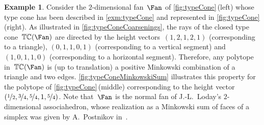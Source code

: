 \documentclass{amsart}
\theoremstyle{definition}
\newtheorem{example}[theorem]{Example}
\newcommand{\ctypeCone}{\smash{\overline{\mathbb{TC}}}} %
\begin{document}
\begin{example}
\label{exm:typeConeMinkowskiSum}
Consider the $2$-dimensional fan~$\Fan$ of \cref{fig:typeCone}\,(left) whose type cone has been described in \cref{exm:typeCone} and represented in \cref{fig:typeCone}\,(right).
As illustrated in \cref{fig:typeConeCoarsenings}, the rays of the closed type cone~$\ctypeCone(\Fan)$ are directed by the height vectors~$(1,2,1,2,1)$ (corresponding to a triangle), $(0,1,1,0,1)$ (corresponding to a vertical segment) and~$(1,0,1,1,0)$ (corresponding to a horizontal segment).
Therefore, any polytope in~$\ctypeCone(\Fan)$ is (up to translation) a positive Minkowski combination of a triangle and two edges.
\cref{fig:typeConeMinkowskiSum} illustrates this property for the polytope of \cref{fig:typeCone}\,(middle) corresponding to the height vector~$(\nicefrac{1}{2}, \nicefrac{3}{4}, \nicefrac{5}{4}, 1, \nicefrac{5}{4})$.
Note that~$\Fan$ is the normal fan of J.-L.~Loday's $2$-dimensional associahedron, whose realization as a Minkowski sum of faces of a simplex was given by A.~Postnikov in~\cite{Postnikov}.


\end{example}
\end{document}
